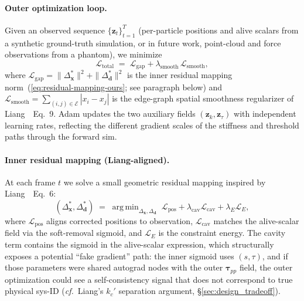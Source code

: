 \documentclass[letterpaper, 10 pt, conference]{ieeeconf}  %
\theoremstyle{tight}
\begin{document}
\paragraph{Outer optimization loop.}
Given an observed sequence $\{\mathbf{z}_t\}_{t=1}^{T}$ (per-particle
positions and alive scalars from a synthetic ground-truth simulation, or
in future work, point-cloud and force observations from a phantom), we
minimize
\begin{equation}
  \mathcal{L}_{\mathrm{total}} \;=\; \mathcal{L}_{\mathrm{gap}}
  + \lambda_{\mathrm{smooth}}\,\mathcal{L}_{\mathrm{smooth}},
  \label{eq:outer-loss}
\end{equation}
where $\mathcal{L}_{\mathrm{gap}} = \|\Delta_{\mathbf{x}}^{*}\|^2 +
\|\Delta_{\mathbf{d}}^{*}\|^2$ is the inner residual mapping
norm~(\ref{eq:residual-mapping-ours}; see paragraph below) and
$\mathcal{L}_{\mathrm{smooth}} = \sum_{(i,j)\in\mathcal{E}}|x_i - x_j|$
is the edge-graph spatial smoothness regularizer of
Liang~\cite{liang2023}~Eq.~9. Adam updates the two auxiliary fields
$(\mathbf{z}_k, \mathbf{z}_\tau)$ with independent learning rates,
reflecting the different gradient scales of the stiffness and threshold
paths through the forward sim.

\paragraph{Inner residual mapping (Liang-aligned).}
At each frame $t$ we solve a small geometric residual mapping
inspired by Liang~\cite{liang2023}~Eq.~6:
\begin{equation}
  (\Delta_{\mathbf{x}}^{*},\Delta_{\mathbf{d}}^{*})
    \;=\; \mathop{\mathrm{arg\,min}}_{\Delta_{\mathbf{x}},\Delta_{\mathbf{d}}}
      \;\mathcal{L}_{\mathrm{pos}} + \lambda_{\mathrm{cav}}\mathcal{L}_{\mathrm{cav}}
      + \lambda_E \mathcal{L}_E,
  \label{eq:residual-mapping-ours}
\end{equation}
where $\mathcal{L}_{\mathrm{pos}}$ aligns corrected positions to
observation, $\mathcal{L}_{\mathrm{cav}}$ matches the alive-scalar field
via the soft-removal sigmoid, and $\mathcal{L}_E$ is the constraint
energy. The cavity term contains the sigmoid in the alive-scalar
expression, which structurally exposes a potential ``fake gradient''
path: the inner sigmoid uses $(s,\tau)$, and if those parameters were
shared autograd nodes with the outer $\boldsymbol{\tau}_{pp}$ field, the
outer optimization could see a self-consistency signal that does not
correspond to true physical sys-ID (\emph{cf.}~Liang's $k_c'$ separation
argument, \S\ref{sec:design_tradeoff}).
\end{document}
